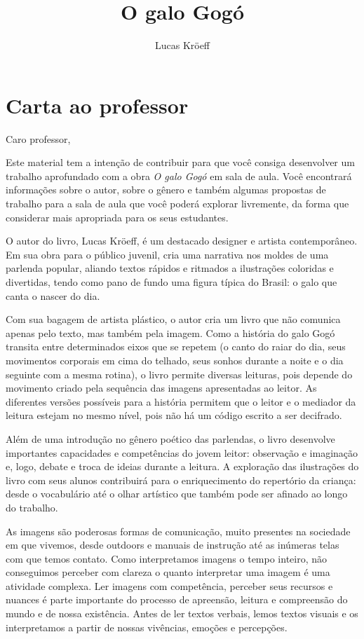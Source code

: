 \documentclass[11pt]{extarticle}
\newcommand{\AutorLivro}{Lucas Kröeff}
\newcommand{\TituloLivro}{O galo Gogó}
\newcommand{\colaborador}{Paulo Pompermaier}
\begin{document}
\title{\TituloLivro}
\author{\AutorLivro}
\def\authornotes{\colaborador}

\date{}
\maketitle

\tableofcontents

\section{Carta ao professor}

Caro professor,

Este material tem a intenção de contribuir para que você consiga desenvolver um trabalho aprofundado com a obra \textit{O galo Gogó} em sala de aula.
Você encontrará informações sobre o autor, sobre o gênero e também 
algumas propostas de trabalho para a sala de aula que você poderá explorar livremente, 
da forma que considerar mais apropriada para os seus estudantes.

O autor do livro, Lucas Kröeff, é um destacado designer e artista contemporâneo.
Em sua obra para o público juvenil, cria uma narrativa nos moldes de uma parlenda popular, aliando textos rápidos e ritmados a ilustrações coloridas e divertidas, tendo como pano de fundo uma figura típica do Brasil: o galo que canta o nascer do dia.

Com sua bagagem de artista plástico, o autor cria um livro que não comunica apenas pelo texto, mas também pela imagem. Como a história do galo Gogó transita entre determinados eixos que se repetem (o canto do raiar do dia, seus movimentos corporais em cima do telhado, seus sonhos durante a noite e o dia seguinte com a mesma rotina), o livro permite diversas leituras, pois depende do movimento criado pela
sequência das imagens apresentadas ao leitor. As diferentes versões possíveis 
para a história permitem que o leitor e o mediador da leitura estejam 
no mesmo nível, pois não há um código escrito a ser decifrado. 

Além de uma introdução no gênero poético das parlendas, o livro desenvolve importantes capacidades e competências do jovem leitor:
observação e imaginação e, logo, debate e troca de ideias durante 
a leitura. A exploração das ilustrações do livro com seus alunos contribuirá 
para o enriquecimento do repertório da criança: desde o vocabulário até o 
olhar artístico que também pode ser afinado ao longo do trabalho.

As imagens são poderosas formas de comunicação, 
muito presentes na sociedade em que vivemos, desde outdoors e manuais de 
instrução até as inúmeras telas com que temos contato. Como interpretamos 
imagens o tempo inteiro, não conseguimos perceber com clareza o quanto 
interpretar uma imagem é uma atividade complexa. Ler imagens com competência, 
perceber seus recursos e nuances é parte importante do processo de apreensão, 
leitura e compreensão do mundo e de nossa existência. Antes de ler textos 
verbais, lemos textos visuais e os interpretamos a partir de nossas vivências, 
emoções e percepções.
\end{document}
